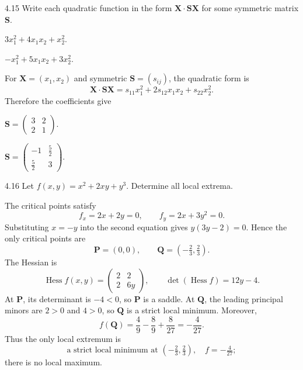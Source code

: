 \documentclass[11pt,oneside]{article}
\begin{document}
\begin{problem}{4.15}
Write each quadratic function in the form
$\mathbf X\cdot\mathbf S\mathbf X$ for some symmetric matrix $\mathbf S$.
\begin{problemsubparts}
\item $3x_1^2+4x_1x_2+x_2^2$.
\item $-x_1^2+5x_1x_2+3x_2^2$.
\end{problemsubparts}
\end{problem}
\begin{solution}
For $\mathbf X=(x_1,x_2)$ and symmetric
$\mathbf S=(s_{ij})$, the quadratic form is
\[
 \mathbf X\cdot\mathbf S\mathbf X
 =s_{11}x_1^2+2s_{12}x_1x_2+s_{22}x_2^2.
\]
Therefore the coefficients give
\begin{problemsubparts}
\item $\displaystyle\boxed{\mathbf S=\begin{pmatrix}3&2\\2&1\end{pmatrix}}$.
\item $\displaystyle\boxed{\mathbf S=\begin{pmatrix}-1&\frac52\\[2pt]\frac52&3\end{pmatrix}}$.
\end{problemsubparts}
\end{solution}

\begin{problem}{4.16}
Let $f(x,y)=x^2+2xy+y^3$. Determine all local extrema.
\end{problem}
\begin{solution}
The critical points satisfy
\[
 f_x=2x+2y=0,\qquad f_y=2x+3y^2=0.
\]
Substituting $x=-y$ into the second equation gives
$y(3y-2)=0$. Hence the only critical points are
\[
 \mathbf P=(0,0),\qquad \mathbf Q=(-\tfrac23,\tfrac23).
\]
The Hessian is
\[
 \operatorname{Hess}f(x,y)=\begin{pmatrix}2&2\\2&6y\end{pmatrix},
 \qquad \det(\operatorname{Hess}f)=12y-4.
\]
At $\mathbf P$, its determinant is $-4<0$, so $\mathbf P$ is a saddle.
At $\mathbf Q$, the leading principal minors are $2>0$ and $4>0$,
so $\mathbf Q$ is a strict local minimum. Moreover,
\[
 f(\mathbf Q)=\frac49-\frac89+\frac8{27}=-\frac4{27}.
\]
Thus the only local extremum is
\[
 \boxed{\text{a strict local minimum at }(-\tfrac23,\tfrac23),
 \quad f=-\tfrac4{27}};
\]
there is no local maximum.
\end{solution}
\end{document}
